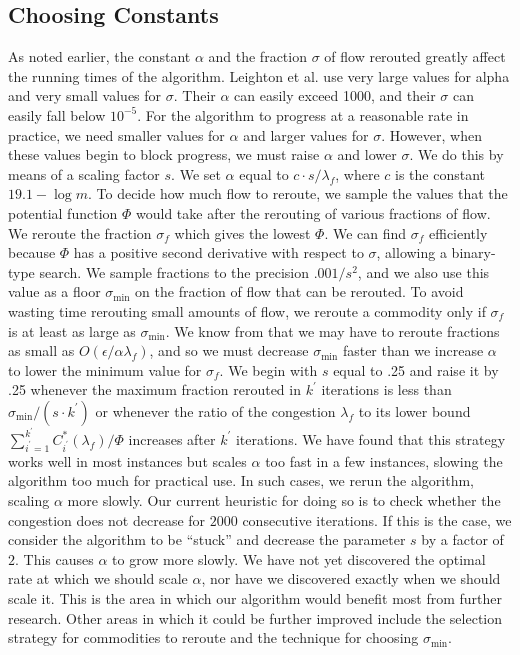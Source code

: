 \subsection{Choosing Constants}
As noted earlier, the constant $\alpha$ and the fraction $\sigma$ of
flow rerouted greatly affect the running times of the algorithm.
Leighton et al. use very large values for alpha and very small values
for $\sigma$.  Their $\alpha$ can easily exceed 1000, and their
$\sigma$ can easily fall below $10^{-5}$.  For the algorithm to
progress at a reasonable rate in practice, we need smaller values for
$\alpha$ and larger values for $\sigma$.  However, when these values
begin to block progress, we must raise $\alpha$ and lower $\sigma$.
We do this by means of a scaling factor $s$.  We set $\alpha$ equal to
$c \cdot s / \lambda_f$, where $c$ is the constant $19.1 - \log m$.
To decide how much flow to reroute, we sample the values that the
potential function $\Phi$ would take after the rerouting of various
fractions of flow.  We reroute the fraction $\sigma_f$ which gives the
lowest $\Phi$.  We can find $\sigma_f$ efficiently because $\Phi$ has
a positive second derivative with respect to $\sigma$, allowing a
binary-type search.  We sample fractions to the precision $.001 /
s^2$, and we also use this value as a floor $\sigma_{\min}$ on the
fraction of flow that can be rerouted.  To avoid wasting time
rerouting small amounts of flow, we reroute a commodity only if
$\sigma_f$ is at least as large as $\sigma_{\min}$.  We know from
\cite{LeightonMPSTT91} that we may have to reroute fractions as small
as $O(\epsilon / \alpha \lambda_f)$, and so we must decrease
$\sigma_{\min}$ faster than we increase $\alpha$ to lower the minimum
value for $\sigma_f$.  We begin with $s$ equal to .25 and raise it by
.25 whenever the maximum fraction rerouted in $k^\prime$ iterations is
less than $\sigma_{\min} / (s \cdot k^\prime)$ or whenever the ratio
of the congestion $\lambda_f$ to its lower bound $\sum_{i^\prime =
1}^{k^\prime}C_{i^\prime}^* (\lambda_f) / \Phi$ increases after
$k^\prime$ iterations.  We have found that this strategy works well in
most instances but scales $\alpha$ too fast in a few instances,
slowing the algorithm too much for practical use.  In such cases, we
rerun the algorithm, scaling $\alpha$ more slowly.  Our current
heuristic for doing so is to check whether the congestion does not
decrease for $2000$ consecutive iterations.  If this is the case, we
consider the algorithm to be ``stuck'' and decrease the parameter $s$
by a factor of $2$.  This causes $\alpha$ to grow more slowly.  We have
not yet discovered the optimal rate at which we should scale $\alpha$,
nor have we discovered exactly when we should scale it.  This is the
area in which our algorithm would benefit most from further research.
Other areas in which it could be further improved include the
selection strategy for commodities to reroute and the technique for
choosing $\sigma_{\min}$.

